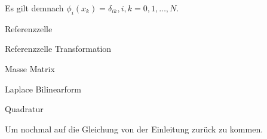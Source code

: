 Es gilt demnach $\phi_i (x_k) = \delta_{ik}, i,k =0,1,\dots,N$.

\begin{Bemerkung} Referenzzelle

\end{Bemerkung}

\begin{Satz} Referenzzelle Transformation

\end{Satz}

\begin{Definition} Masse Matrix \\

\end{Definition}

\begin{Definition} Laplace Bilinearform \\

\end{Definition}

\begin{Satz} Quadratur \\

\end{Satz}


Um nochmal auf die Gleichung von der Einleitung zurück zu kommen.

